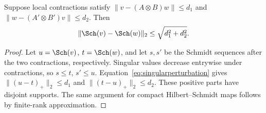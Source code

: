 \begin{lemma}\label{lem:domination}
Suppose local contractions satisfy
$\|v-(A\otimes B)w\|\leq d_1$ and
$\|w-(A'\otimes B')v\|\leq d_2$. Then
\[
\|\Sch(v)-\Sch(w)\|_2\leq\sqrt{d_1^2+d_2^2}.
\]
\end{lemma}
\begin{proof}
Let $u=\Sch(v)$, $t=\Sch(w)$, and let $s,s'$ be the Schmidt sequences
after the two contractions, respectively. Singular values decrease
entrywise under contractions, so $s\leq t$, $s'\leq u$.
Equation~\eqref{eq:singularperturbation} gives
$\|(u-t)_+\|_2\leq d_1$ and $\|(t-u)_+\|_2\leq d_2$.
These positive parts have disjoint supports. The same argument for compact
Hilbert--Schmidt maps follows by finite-rank approximation.
\end{proof}

